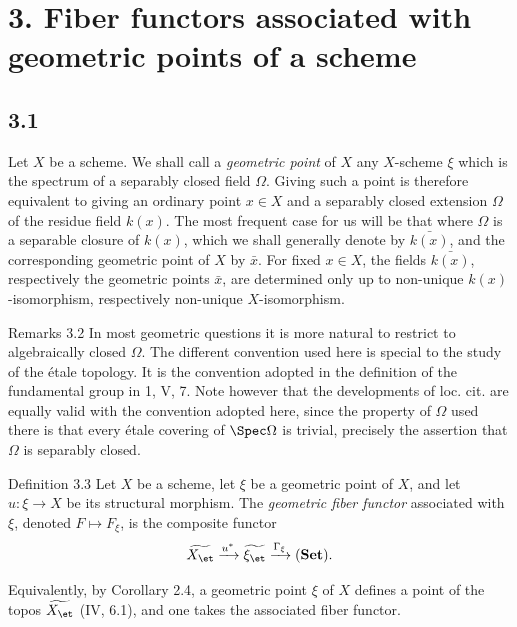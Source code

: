 \section*{3. Fiber functors associated with geometric points of a scheme}

\subsection*{3.1}
Let \(X\) be a scheme. We shall call a \emph{geometric point} of \(X\) any \(X\)-scheme \(\xi\) which is the spectrum of a separably closed field \(\Omega\). Giving such a point is therefore equivalent to giving an ordinary point \(x\in X\) and a separably closed extension \(\Omega\) of the residue field \(k(x)\). The most frequent case for us will be that where \(\Omega\) is a separable closure of \(k(x)\), which we shall generally denote by \(\bar{k(x)}\), and the corresponding geometric point of \(X\) by \(\bar x\). For fixed \(x\in X\), the fields \(\bar{k(x)}\), respectively the geometric points \(\bar x\), are determined only up to non-unique \(k(x)\)-isomorphism, respectively non-unique \(X\)-isomorphism.

\begin{remarktext}{Remarks 3.2}
In most geometric questions it is more natural to restrict to algebraically closed \(\Omega\). The different convention used here is special to the study of the \'etale topology. It is the convention adopted in the definition of the fundamental group in \SGA{} 1, V, 7. Note however that the developments of loc. cit. are equally valid with the convention adopted here, since the property of \(\Omega\) used there is that every \'etale covering of \(\Spec\Omega\) is trivial, precisely the assertion that \(\Omega\) is separably closed.
\end{remarktext}

\begin{statement}{Definition 3.3}
Let \(X\) be a scheme, let \(\xi\) be a geometric point of \(X\), and let \(u:\xi\to X\) be its structural morphism. The \emph{geometric fiber functor} associated with \(\xi\), denoted \(F\mapsto F_\xi\), is the composite functor
\[
\widetilde{X_{\et}}\xrightarrow{u^*}\widetilde{\xi_{\et}}\xrightarrow{\Gamma_\xi}(\mathbf{Set}).
\]
\end{statement}

Equivalently, by Corollary 2.4, a geometric point \(\xi\) of \(X\) defines a point of the topos \(\widetilde{X_{\et}}\) (IV, 6.1), and one takes the associated fiber functor.

